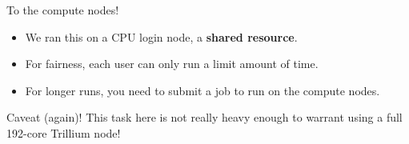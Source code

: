 \documentclass[
  10pt,
  ignorenonframetext,
  aspectratio=169]{beamer}
\newenvironment{Shaded}{\begin{snugshade}}{\end{snugshade}}
\newcommand{\ExtensionTok}[1]{\textcolor[rgb]{0.80,0.80,0.80}{#1}}
\newcommand{\KeywordTok}[1]{\textcolor[rgb]{0.94,0.87,0.69}{#1}}
\newcommand{\NormalTok}[1]{\textcolor[rgb]{0.80,0.80,0.80}{#1}}
\begin{document}
\begin{frame}[fragile]{To the compute nodes!}
\label{to-the-compute-nodes}
\begin{Shaded}
\end{Shaded}

\begin{itemize}
\item
  We ran this on a CPU login node, a \textbf{shared resource}.
\item
  For fairness, each user can only run a limit amount of time.

  \pause
\item
  For longer runs, you need to submit a job to run on the compute nodes.

  \pause
\end{itemize}

\alert{Caveat (again)! This task here is not really heavy enough to warrant using a full 192-core Trillium node!}
\end{frame}
\end{document}
